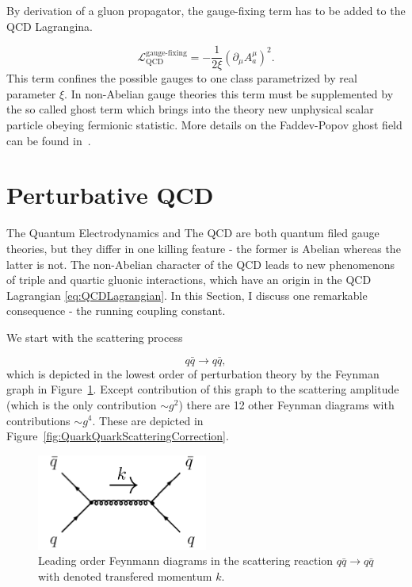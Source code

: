 By derivation of a gluon propagator, the gauge-fixing term has to be added to
the QCD Lagrangina.

\begin{equation}
  \mathscr{L}_{\text{QCD}}^{\text{gauge-fixing}} = - \frac{1}{2\xi} \left( \partial_\mu A_a^\mu
  \right)^2.
  \label{eq:QCDGaugeFixingTerm}
\end{equation}
This term confines the possible gauges to one class parametrized by real parameter
$\xi$. In non-Abelian gauge theories this term must be supplemented by the so
called ghost term which brings into the theory new unphysical scalar particle
obeying fermionic statistic. More details on the Faddev-Popov ghost field
can be found in~\cite{FaddeevPopovGhosts}.


\section{Perturbative QCD}

The Quantum Electrodynamics and The QCD are both quantum filed gauge theories, but
they differ in one killing feature - the former is Abelian whereas the latter is
not. The non-Abelian character of the QCD leads to new phenomenons of triple and
quartic gluonic interactions, which have an origin in the QCD Lagrangian
\eqref{eq:QCDLagrangian}. 
In this Section, I discuss one remarkable consequence - the running coupling
constant.

We start with the scattering process

\begin{equation}
  q \bar{q} \rightarrow q \bar{q},
  \label{eq:QuarkScattering}
\end{equation}
which is depicted in the lowest order of perturbation theory by the Feynman
graph in Figure~\ref{fig:QuarkQuarkScattering}. Except contribution of this
graph to the scattering amplitude (which is the only contribution $\sim g^2$)
there are 12 other Feynman diagrams with contributions $\sim g^4$. These are
depicted in Figure~\ref{fig:QuarkQuarkScatteringCorrection}. 

\begin{figure}
  \centering
  \includegraphics[width=0.5\textwidth]{Chapter1/QuarkQuarkScattering.png} 
  \caption{Leading order Feynmann diagrams in the scattering reaction $q \bar{q}
    \rightarrow q \bar{q}$ with denoted transfered momentum $k$.}
  \label{fig:QuarkQuarkScattering}
\end{figure}

